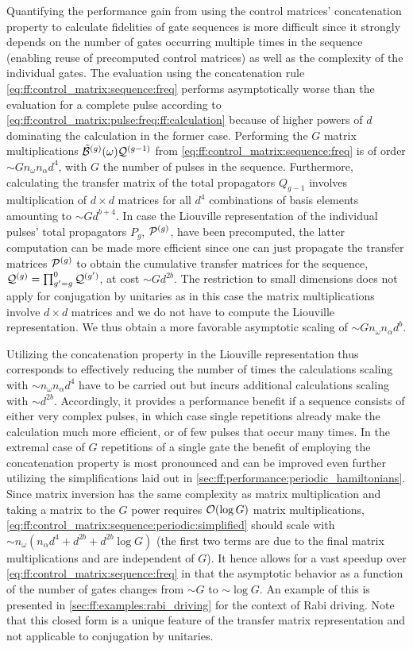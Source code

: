 Quantifying the performance gain from using the control matrices' concatenation property to calculate fidelities of gate sequences is more difficult since it strongly depends on the number of gates occurring multiple times in the sequence (enabling reuse of precomputed control matrices) as well as the complexity of the individual gates.
The evaluation using the concatenation rule \cref{eq:ff:control_matrix:sequence:freq} performs asymptotically worse than the evaluation for a complete pulse according to \cref{eq:ff:control_matrix:pulse:freq:ff:calculation} because of higher powers of $d$ dominating the calculation in the former case.
Performing the $G$ matrix multiplications $\tilde{\mathcal{B}}^{(g)}(\omega)\mathcal{Q}^{(g-1)}$ from \cref{eq:ff:control_matrix:sequence:freq} is of order $\sim G n_\omega n_\alpha d^4$, with $G$ the number of pulses in the sequence.
Furthermore, calculating the transfer matrix of the total propagators $Q_{g-1}$ involves multiplication of $d\times d$ matrices for all $d^4$ combinations of basis elements amounting to $\sim G d^{b+4}$.
In case the Liouville representation of the individual pulses' total propagators $P_g$, $\mathcal{P}^{(g)}$, have been precomputed, the latter computation can be made more efficient since one can just propagate the transfer matrices $\mathcal{P}^{(g)}$ to obtain the cumulative transfer matrices for the sequence, $\mathcal{Q}^{(g)}=\prod_{g'=g}^0\mathcal{Q}^{(g')}$, at cost $\sim G d^{2b}$.
The restriction to small dimensions does not apply for conjugation by unitaries as in this case the matrix multiplications involve $d\times d$ matrices and we do not have to compute the Liouville representation.
We thus obtain a more favorable asymptotic scaling of $\sim G n_\omega n_\alpha d^b$.

Utilizing the concatenation property in the Liouville representation thus corresponds to effectively reducing the number of times the calculations scaling with $\sim n_\omega n_\alpha d^4$ have to be carried out but incurs additional calculations scaling with $\sim d^{2b}$.
Accordingly, it provides a performance benefit if a sequence consists of either very complex pulses, in which case single repetitions already make the calculation much more efficient, or of few pulses that occur many times.
In the extremal case of $G$ repetitions of a single gate the benefit of employing the concatenation property is most pronounced and can be improved even further utilizing the simplifications laid out in \cref{sec:ff:performance:periodic_hamiltonians}.
Since matrix inversion has the same complexity as matrix multiplication and taking a matrix to the $G$ power requires $\order{\log G}$ matrix multiplications, \cref{eq:ff:control_matrix:sequence:periodic:simplified} should scale with $\sim n_\omega (n_\alpha d^4 + d^{2b} + d^{2b}\log{G})$ (the first two terms are due to the final matrix multiplications and are independent of $G$).
It hence allows for a vast speedup over \cref{eq:ff:control_matrix:sequence:freq} in that the asymptotic behavior as a function of the number of gates changes from $\sim G$ to $\sim\log G$.
An example of this is presented in \cref{sec:ff:examples:rabi_driving} for the context of Rabi driving.
Note that this closed form is a unique feature of the transfer matrix representation and not applicable to conjugation by unitaries.

